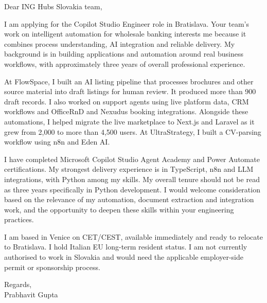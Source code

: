 \documentclass[a4paper,11pt]{article}
\begin{document}
Dear ING Hubs Slovakia team,

I am applying for the Copilot Studio Engineer role in Bratislava. Your team's work on intelligent automation for wholesale banking interests me because it combines process understanding, AI integration and reliable delivery. My background is in building applications and automation around real business workflows, with approximately three years of overall professional experience.

At FlowSpace, I built an AI listing pipeline that processes brochures and other source material into draft listings for human review. It produced more than 900 draft records. I also worked on support agents using live platform data, CRM workflows and OfficeRnD and Nexudus booking integrations. Alongside these automations, I helped migrate the live marketplace to Next.js and Laravel as it grew from 2,000 to more than 4,500 users. At UltraStrategy, I built a CV-parsing workflow using n8n and Eden AI.

I have completed Microsoft Copilot Studio Agent Academy and Power Automate certifications. My strongest delivery experience is in TypeScript, n8n and LLM integrations, with Python among my skills. My overall tenure should not be read as three years specifically in Python development. I would welcome consideration based on the relevance of my automation, document extraction and integration work, and the opportunity to deepen these skills within your engineering practices.

I am based in Venice on CET/CEST, available immediately and ready to relocate to Bratislava. I hold Italian EU long-term resident status. I am not currently authorised to work in Slovakia and would need the applicable employer-side permit or sponsorship process.

Regards,\\
Prabhavit Gupta
\end{document}
